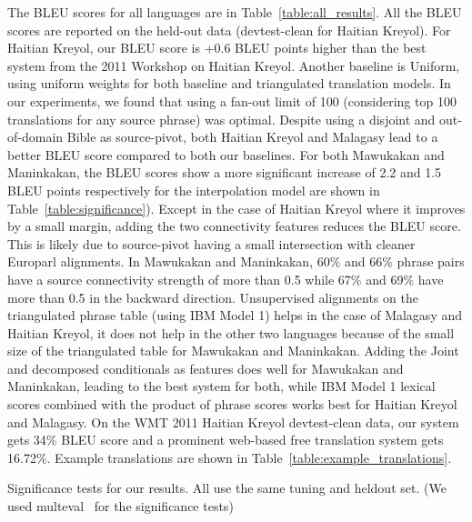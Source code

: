 \documentclass[11pt]{article}
\begin{document}
	The BLEU scores for all languages are in Table~\ref{table:all_results}. All the BLEU scores are reported on the held-out data (devtest-clean for Haitian Kreyol). For Haitian Kreyol, our BLEU score is +0.6 BLEU points higher than the best system from the 2011 Workshop on Haitian Kreyol. Another baseline is Uniform, using uniform weights for both baseline and triangulated translation models.  
	In our experiments, we found that using a fan-out limit of 100 (considering top 100 translations for any source phrase) was optimal. 
	Despite using a disjoint and out-of-domain Bible as source-pivot, both Haitian Kreyol and Malagasy lead to a better BLEU score compared to both our baselines. 
	For both Mawukakan and Maninkakan, the BLEU scores show a more significant increase of 2.2 and 1.5 BLEU points respectively for the interpolation model are shown in Table~\ref{table:significance}). 
	Except in the case of Haitian Kreyol where it improves by a small margin, adding the two connectivity features reduces the BLEU score. This is likely due to source-pivot having a small intersection with cleaner Europarl alignments. In Mawukakan and Maninkakan, 60\% and 66\% phrase pairs have a source connectivity strength of more than 0.5 while 67\% and 69\% have more than 0.5 in the backward direction.
Unsupervised alignments on the triangulated phrase table (using IBM Model 1) helps in the case of Malagasy and Haitian Kreyol, it does not help in the other two languages because of the small size of the triangulated table for Mawukakan and Maninkakan. Adding the Joint and decomposed conditionals as features does well for Mawukakan and Maninkakan, leading to the best system for both, while IBM Model 1 lexical scores combined with the product of phrase scores works best for Haitian Kreyol and Malagasy. On the WMT 2011 Haitian Kreyol devtest-clean data, our system gets 34\% BLEU score and a prominent web-based free translation system gets 16.72\%. Example translations are shown in Table~\ref{table:example_translations}. 
		\begin{table}
			{\footnotesize
			
			}
			\caption{Significance tests for our results. All use the same tuning and heldout set. (We used multeval~\cite{Clark:11} for the significance tests)}
			\label{table:significance}
		\end{table}
\end{document}
